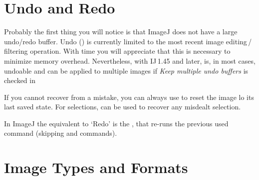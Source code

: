 

\section[Undo and Redo]{Undo and Redo\label{sec:Undo-and-Redo}}

Probably the first thing you will notice is that ImageJ does not have
a large undo/redo buffer. Undo (\textsf{})
is currently limited to the most recent image editing\,/\,filtering
operation. With time you will appreciate that this is necessary to
minimize memory overhead. Nevertheless, with IJ\,1.45 and later,
\textsf{} is, in most
cases, undoable and can be applied to multiple images if \emph{Keep
multiple undo buffers }is checked in \textsf{}

If you cannot recover from a mistake, you can always use \textsf{}
to reset the image lo its last saved state. For selections, \textsf{}
can be used to recover any misdealt selection.

In ImageJ the equivalent to `Redo' is the \textsf{},
that re-runs the previous used command (skipping \textsf{}
and \textsf{}
commands).




\section{Image Types and Formats\label{sec:Image-Types}}


